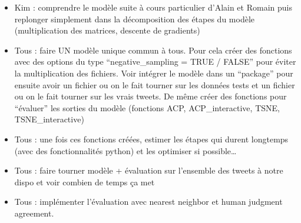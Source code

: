 \documentclass[11pt,french,french]{article}
\begin{document}
\begin{itemize}
\item
  Kim : comprendre le modèle suite à cours particulier d'Alain et Romain
  puis replonger simplement dans la décomposition des étapes du modèle
  (multiplication des matrices, descente de gradients)
\item
  Tous : faire UN modèle unique commun à tous. Pour cela créer des
  fonctions avec des options du type ``negative\_sampling = TRUE /
  FALSE'' pour éviter la multiplication des fichiers. Voir intégrer le
  modèle dans un ``package'' pour ensuite avoir un fichier ou on le fait
  tourner sur les données tests et un fichier ou on le fait tourner sur
  les vrais tweets. De même créer des fonctions pour ``évaluer'' les
  sorties du modèle (fonctions ACP, ACP\_interactive, TSNE,
  TSNE\_interactive)
\item
  Tous : une fois ces fonctions créées, estimer les étapes qui durent
  longtemps (avec des fonctionnalités python) et les optimiser si
  possible\ldots{}
\item
  Tous : faire tourner modèle + évaluation sur l'ensemble des tweets à
  notre dispo et voir combien de temps ça met
\item
  Tous : implémenter l'évaluation avec nearest neighbor et human
  judgment agreement.
\end{itemize}
\end{document}
